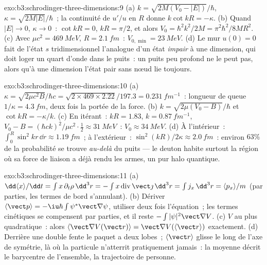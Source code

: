 \begin{solution}{exo:b3:schrodinger-three-dimensions:9}
(a) $k = \sqrt{2M(V_0 - |E|)}/\hbar$, $\kappa = \sqrt{2M|E|}/\hbar$~;
la continuité de $u'/u$ en $R$ donne $k\cot kR = -\kappa$. (b) Quand $|E|
\to 0$, $\kappa \to 0$~: $\cot kR = 0$, $kR = \pi/2$, et alors $V_0 =
\hbar^2k^2/2M = \pi^2\hbar^2/8MR^2$. (c) Avec $\mu c^2 =
\qty{469}{MeV}$, $R = \qty{2.1}{fm}$~: $V_{0,\min} = \qty{23}{MeV}$.
(d) Le mur $u(0) = 0$ fait de l'état $s$ tridimensionnel l'analogue
d'un état \emph{impair} à une dimension, qui doit loger un quart
d'onde dans le puits~: un puits peu profond ne le peut pas, alors qu'à
une dimension l'état pair sans nœud lie toujours.
\end{solution}

\begin{solution}{exo:b3:schrodinger-three-dimensions:10}
(a) $\kappa = \sqrt{2\mu c^2B}/\hbar c = \sqrt{2 \times 469 \times
2.22}/197.3 = \qty{0.231}{fm^{-1}}$~: longueur de queue $1/\kappa =
\qty{4.3}{fm}$, deux fois la portée de la force. (b) $k =
\sqrt{2\mu(V_0 - B)}/\hbar$ et $\cot kR = -\kappa/k$. (c) En itérant~:
$kR = 1.83$, $k = \qty{0.87}{fm^{-1}}$, $V_0 - B = (\hbar ck)^2/\mu
c^2\cdot\tfrac12 \approx \qty{31}{MeV}$~: $V_0 \approx \qty{34}{MeV}$.
(d) À l'intérieur~: $\int_0^R\sin^2kr\,\dd r \approx \qty{1.19}{fm}$~;
à l'extérieur~: $\sin^2(kR)/2\kappa \approx \qty{2.0}{fm}$~: environ
$63\%$ de la probabilité se trouve \emph{au-delà} du puits --- le
deuton habite surtout la région où sa force de liaison a déjà rendu les
armes, un pur halo quantique.
\end{solution}

\begin{solution}{exo:b3:schrodinger-three-dimensions:11}
(a) $\dd\langle x\rangle/\dd t = \int x\,\partial_t\rho\,\dd^3r =
-\int x\operatorname{div}\vect\jmath\,\dd^3r = \int j_x\,\dd^3r =
\langle p_x\rangle/m$ (par parties, les termes de bord s'annulant). (b)
Dériver $\langle\vect p\rangle = -\iu\hbar\int\psi^*\vect\nabla
\psi$, utiliser deux fois l'équation~; les termes cinétiques se
compensent par parties, et il reste $-\int|\psi|^2\vect\nabla V$. (c)
$V$ au plus quadratique~: alors $\langle\vect\nabla V(\vect r)\rangle = \vect\nabla V(\langle
\vect r\rangle)$ exactement. (d) Derrière une double fente le paquet a
deux lobes~; $\langle\vect r\rangle$ glisse le long de l'axe de
symétrie, là où la particule n'atterrit pratiquement jamais~: la
moyenne décrit le barycentre de l'ensemble, la trajectoire de personne.
\end{solution}

